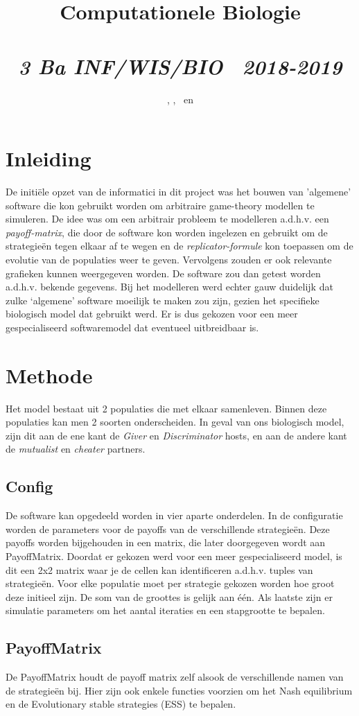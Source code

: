 \documentclass{article}
\title{\textmd{\textbf{Computationele Biologie}}\\\normalsize\vspace{0.1in}\Large{\assignmentname}\\\vspace{0.1in}\small{\textit{3 Ba INF/WIS/BIO \  2018-2019}}}
\author{\studentA, \studentB, \studentC \ en \studentD}
\date{}
\begin{document}
\maketitle

\section{Inleiding}
De initiële opzet van de informatici in dit project was het bouwen van 'algemene' software die kon gebruikt worden om arbitraire game-theory modellen te simuleren. De idee was om een arbitrair probleem te modelleren a.d.h.v. een \emph{payoff-matrix}, die door de software kon worden ingelezen en gebruikt om de strategieën tegen elkaar af te wegen en de \emph{replicator-formule} kon toepassen om de evolutie van de populaties weer te geven. Vervolgens zouden er ook relevante grafieken kunnen weergegeven worden. De software zou dan getest worden a.d.h.v. bekende gegevens. 
Bij het modelleren werd echter gauw duidelijk dat zulke ‘algemene’ software moeilijk te maken zou zijn, gezien het specifieke biologisch model dat gebruikt werd. Er is dus gekozen voor een meer gespecialiseerd softwaremodel dat eventueel uitbreidbaar is.

\section{Methode}
Het model bestaat uit 2 populaties die met elkaar samenleven. Binnen deze populaties kan men 2 soorten onderscheiden. In geval van ons biologisch model, zijn dit aan de ene kant de \emph{Giver} en \emph{Discriminator} hosts, en aan de andere kant de \emph{mutualist} en \emph{cheater} partners.

\subsection{Config}
De software kan opgedeeld worden in vier aparte onderdelen.
In de configuratie worden de parameters voor de payoffs van de verschillende strategieën. Deze payoffs worden bijgehouden in een matrix, die later doorgegeven wordt aan PayoffMatrix. Doordat er gekozen werd voor een meer gespecialiseerd model, is dit een 2x2 matrix waar je de cellen kan identificeren a.d.h.v. tuples van strategieën. Voor elke populatie moet per strategie gekozen worden hoe groot deze initieel zijn. De som van de groottes is gelijk aan één. Als laatste zijn er simulatie parameters om het aantal iteraties en een stapgrootte te bepalen.
\subsection{PayoffMatrix}
De PayoffMatrix houdt de payoff matrix zelf alsook de verschillende namen van de strategieën bij. Hier zijn ook enkele functies voorzien om het Nash equilibrium en de Evolutionary stable strategies (ESS) te bepalen.
\end{document}
